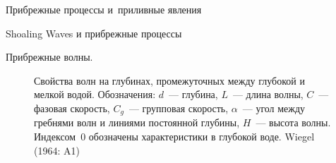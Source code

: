 \begin{chapter}{Прибрежные процессы и~приливные явления}
\begin{section}{Shoaling Waves и прибрежные процессы}
\begin{paragraph}{Прибрежные волны.}
\begin{figure}[t!]
\caption{Свойства волн на глубинах, промежуточных между глубокой и мелкой 
водой. Обозначения: $d$~--- глубина, $L$~--- длина волны, $C$~--- фазовая
скорость, $C_g$~--- групповая скорость, $\alpha$~--- угол между гребнями
волн и линиями постоянной глубины, $H$~--- высота волны. 
Индексом~$0$ обозначены характеристики в глубокой воде.
Wiegel (1964: A1)}
\label{wiegelgraph}
\end{figure}
%
%


\end{paragraph}
\end{section}
\end{chapter}

